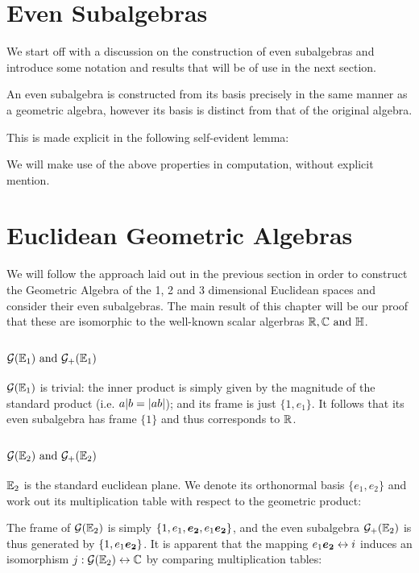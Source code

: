 \section{Even Subalgebras}
We start off with a discussion on the construction of even subalgebras and introduce some notation and results that will be of use in the next section.

An even subalgebra is constructed from its basis precisely in the same manner as a geometric algebra, however its basis is distinct from that of the original algebra.

This is made explicit in the following self-evident lemma:

We will make use of the above properties in computation, without explicit mention.


\newpage

\section{Euclidean Geometric Algebras}
We will follow the approach laid out in the previous section in order to construct the Geometric Algebra of the 1, 2 and 3 dimensional Euclidean spaces and consider their even subalgebras.
The main result of this chapter will be our proof that these are isomorphic to the well-known scalar algerbras $\R, \C \mathrm{\ and\ } \HM$.

\subsection{$\G(\E_1)\ \mathrm{and}\ \G_+(\E_1)$}

$\mathcal{G}(\mathbb{E}_1)$  is trivial: the inner product is simply given by the magnitude of the standard product (i.e. $a | b = \left|ab\right|$); and its frame is just $\{1, e_1\}$.
It follows that its even subalgebra has frame $\{1\}$ and thus corresponds to $\mathbb{R}$.

\subsection{$\G(\E_2)\ \mathrm{and}\ \G_+(\E_2)$}

$\mathbb{E}_2$ is the standard euclidean plane. We denote its orthonormal basis $\{e_1, e_2\}$ and work out its multiplication table with respect to the geometric product:


The frame of $\mathcal{G}(\mathbb{E}_2)$ is simply $\{1, e_1, \boldsymbol{e_2}, e_1\boldsymbol{e_2}\}$, and the even subalgebra $\mathcal{G}_+(\mathbb{E}_2)$ is thus generated by $\{1, e_1\boldsymbol{e_2} \}$.
It is apparent that the mapping $e_1\boldsymbol{e_2} \leftrightarrow i$ induces an isomorphism $j : \mathcal{G}(\mathbb{E}_2) \leftrightarrow \mathbb{C}$ by comparing multiplication tables:


